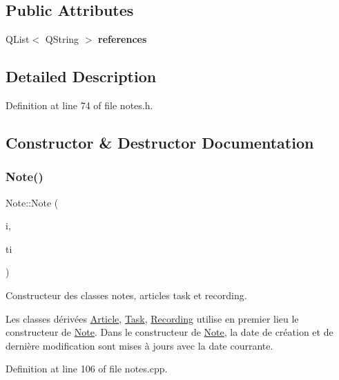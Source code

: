 \subsection*{Public Attributes}
\begin{DoxyCompactItemize}
\item 
\mbox{\label{class_note_ad8918cd74c86c9e00d72cb1a6a5a0f88}} 
Q\+List$<$ Q\+String $>$ {\bfseries references}
\end{DoxyCompactItemize}


\subsection{Detailed Description}


Definition at line 74 of file notes.\+h.



\subsection{Constructor \& Destructor Documentation}
\mbox{\label{class_note_a0490153115307d5f59974d7000260e48}} 
\subsubsection{\texorpdfstring{Note()}{Note()}\hspace{0.1cm}{\footnotesize\ttfamily [1/2]}}
{\footnotesize\ttfamily Note\+::\+Note (\begin{DoxyParamCaption}\item[{const Q\+String \&}]{i,  }\item[{const Q\+String \&}]{ti }\end{DoxyParamCaption})}



Constructeur des classes notes, articles task et recording. 

Les classes dérivées \hyperlink{class_article}{Article}, \hyperlink{class_task}{Task}, \hyperlink{class_recording}{Recording} utilise en premier lieu le constructeur de \hyperlink{class_note}{Note}. Dans le constructeur de \hyperlink{class_note}{Note}, la date de création et de dernière modification sont mises à jours avec la date courrante. 

Definition at line 106 of file notes.\+cpp.

